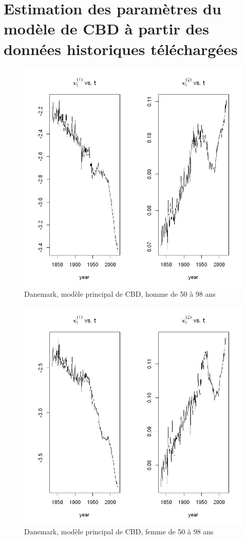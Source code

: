 \section{Estimation des paramètres du modèle de CBD à partir des données historiques téléchargées} 
\begin{figure}[!htb]
 \caption{Danemark, modèle principal de CBD, homme de 50 à 98 ans}
    \centering
    \includegraphics[scale =0.5]{output_18_7.png}
\end{figure}

\begin{figure}[!htb]
 \caption{Danemark, modèle principal de CBD, femme de 50 à 98 ans}
    \centering
    \includegraphics[scale =0.6]{output_18_9.png}
\end{figure}


